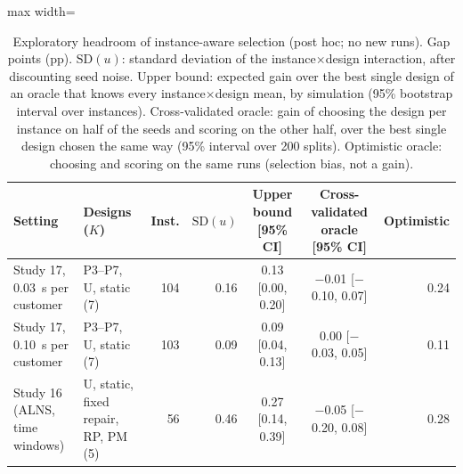 \begin{table}[t]
\caption{Exploratory headroom of instance-aware selection (post hoc; no new runs). Gap points (pp). $\mathrm{SD}(u)$: standard deviation of the instance$\times$design interaction, after discounting seed noise. Upper bound: expected gain over the best single design of an oracle that knows every instance$\times$design mean, by simulation (95\% bootstrap interval over instances). Cross-validated oracle: gain of choosing the design per instance on half of the seeds and scoring on the other half, over the best single design chosen the same way (95\% interval over 200 splits). Optimistic oracle: choosing and scoring on the same runs (selection bias, not a gain).}\label{tab:margem}
\centering
\small
\begin{adjustbox}{max width=\linewidth}
\begin{tabular}{llrrccr}
\toprule
Setting & Designs ($K$) & Inst. & $\mathrm{SD}(u)$ & Upper bound [95\% CI] & Cross-validated oracle [95\% CI] & Optimistic \\
\midrule
Study 17, 0.03~s per customer & P3--P7, U, static (7) & 104 & 0.16 & 0.13 [0.00, 0.20] & $-$0.01 [$-$0.10, 0.07] & 0.24 \\
Study 17, 0.10~s per customer & P3--P7, U, static (7) & 103 & 0.09 & 0.09 [0.04, 0.13] & 0.00 [$-$0.03, 0.05] & 0.11 \\
Study 16 (ALNS, time windows) & U, static, fixed repair, RP, PM (5) & 56 & 0.46 & 0.27 [0.14, 0.39] & $-$0.05 [$-$0.20, 0.08] & 0.28 \\
\bottomrule
\end{tabular}
\end{adjustbox}
\end{table}
